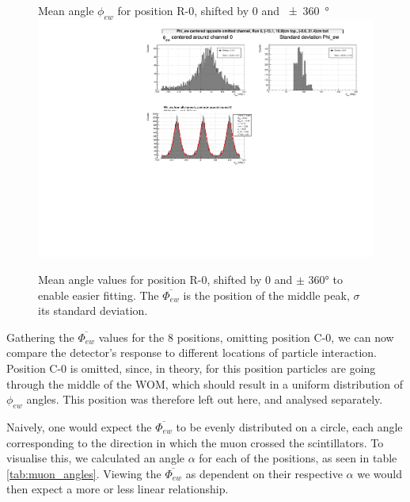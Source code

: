     \begin{figure}[h!]
        \centering
        Mean angle $\phi_{ew}$ for position R-0, shifted by 0 and \SI{\pm 360}{\degree}
        \includegraphics[width=.9\textwidth]{pictures/phi_ew_R0_shift.pdf}
        \caption{Mean angle values for position R-0, shifted by 0 and $\pm$ \ang{360} to enable easier fitting. The $\overline{\Phi_{ew}}$ is the position of the middle peak, $\sigma$ its standard deviation.}
        \label{fig:3-phi-ew-R0}
    \end{figure}
    
    Gathering the $\overline{\Phi_{ew}}$ values for the 8 positions, omitting position C-0, we can now compare the detector's response to different locations of particle interaction. Position C-0 is omitted, since, in theory, for this position particles are going through the middle of the \ac{WOM}, which should result in a uniform distribution of $\phi_{ew}$ angles. This position was therefore left out here, and analysed separately.

    
    Naively, one would expect the $\overline{\Phi_{ew}}$ to be evenly distributed on a circle, each angle corresponding to the direction in which the muon crossed the scintillators. To visualise this, we calculated an angle $\alpha$ for each of the positions, as seen in table \ref{tab:muon_angles}. Viewing the $\overline{\Phi_{ew}}$ as dependent on their respective $\alpha$ we would then expect a more or less linear relationship.
    
